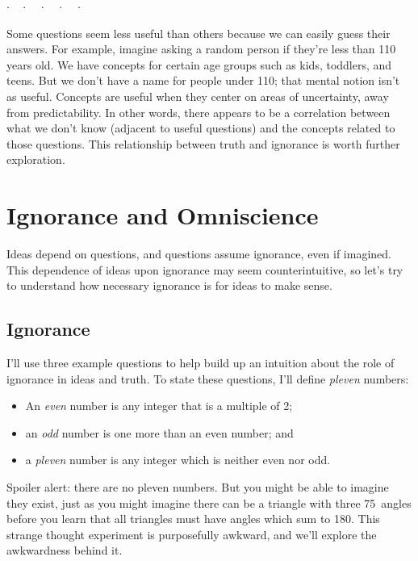 \documentclass[11pt, oneside]{article}
\newcommand{\dotq}{\cdot\quad}
\newcommand{\scenebreak}{
    \medskip\centerline{$\dotq\dotq\dotq\dotq\cdot$}\medskip
}
\begin{document}
\scenebreak

Some questions seem less useful than others because we can easily guess their
answers.
For example,
imagine asking a random person if they're
less than 110 years old.
We have concepts for certain age groups such as kids,
toddlers, and teens.
But we don't have a name for people under 110;
that mental notion isn't as useful.
Concepts are useful when they center on
areas of uncertainty, away from predictability.
In other words, there appears to be a correlation between
what we don't know (adjacent to useful questions) and the concepts
related to those questions.
This relationship between truth and ignorance is worth further exploration.

%
%
%
%
%


\section{Ignorance and Omniscience}

Ideas depend on questions,
and questions assume ignorance,
even if imagined.
This dependence of ideas upon ignorance
may seem counterintuitive, so
let's try to understand how necessary ignorance
is for ideas to make sense.

\subsection{Ignorance}

I'll use three example questions
to help build up an intuition about the role of
ignorance in ideas and truth.
To state these questions, I'll define
{\em pleven} numbers:
\begin{itemize}
    \item An {\em even} number is any integer that is a multiple of 2;
    \item an {\em odd} number is one more than an even number; and
    \item a {\em pleven} number is any integer which is neither even nor odd.
\end{itemize}
Spoiler
alert: there are no pleven numbers.
But you might be able to imagine they exist, just as you might imagine there can
be a triangle with three 75\degree\ angles before you learn that all triangles
must have angles which sum to 180\degree.
This strange thought experiment is purposefully awkward, and we'll
explore the awkwardness behind it.
\end{document}
